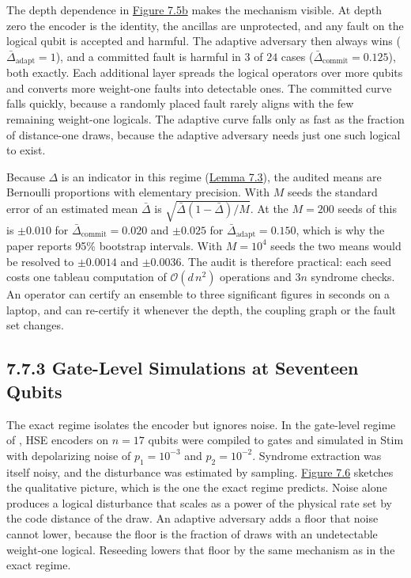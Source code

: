 \documentclass{report}
\theoremstyle{plain}
\theoremstyle{definition}
\theoremstyle{remark}
\newcommand{\bigO}[1]{\mathcal{O}\!\left(#1\right)}
\begin{document}
The depth dependence in \hyperref[fig:qec:disturbance]{Figure 7.5b} makes the mechanism visible. At depth zero the encoder is the identity, the ancillas are unprotected, and any fault on the logical qubit is accepted and harmful. The adaptive adversary then always wins ($\bar\Delta_{\mathrm{adapt}}=1$), and a committed fault is harmful in $3$ of $24$ cases ($\bar\Delta_{\mathrm{commit}}=0.125$), both exactly. Each additional layer spreads the logical operators over more qubits and converts more weight-one faults into detectable ones. The committed curve falls quickly, because a randomly placed fault rarely aligns with the few remaining weight-one logicals. The adaptive curve falls only as fast as the fraction of distance-one draws, because the adaptive adversary needs just one such logical to exist.

Because $\Delta$ is an indicator in this regime (\hyperref[lem:qec:indicator]{Lemma 7.3}), the audited means are Bernoulli proportions with elementary precision. With $M$ seeds the standard error of an estimated mean $\bar\Delta$ is $\sqrt{\bar\Delta(1-\bar\Delta)/M}$. At the $M=200$ seeds of \cite{guo2026qecaudit} this is $\pm0.010$ for $\bar\Delta_{\mathrm{commit}}=0.020$ and $\pm0.025$ for $\bar\Delta_{\mathrm{adapt}}=0.150$, which is why the paper reports 95\% bootstrap intervals. With $M=10^{4}$ seeds the two means would be resolved to $\pm0.0014$ and $\pm0.0036$. The audit is therefore practical: each seed costs one tableau computation of $\bigO{d\,n^{2}}$ operations and $3n$ syndrome checks. An operator can certify an ensemble to three significant figures in seconds on a laptop, and can re-certify it whenever the depth, the coupling graph or the fault set changes.

\subsection{7.7.3 Gate-Level Simulations at Seventeen Qubits}\label{sec:qec:results17}

The exact regime isolates the encoder but ignores noise. In the gate-level regime of \cite{guo2026qecaudit}, HSE encoders on $n=17$ qubits were compiled to gates and simulated in Stim with depolarizing noise of $p_1=10^{-3}$ and $p_2=10^{-2}$. Syndrome extraction was itself noisy, and the disturbance was estimated by sampling. \hyperref[fig:qec:stim]{Figure 7.6} sketches the qualitative picture, which is the one the exact regime predicts. Noise alone produces a logical disturbance that scales as a power of the physical rate set by the code distance of the draw. An adaptive adversary adds a floor that noise cannot lower, because the floor is the fraction of draws with an undetectable weight-one logical. Reseeding lowers that floor by the same mechanism as in the exact regime.
\end{document}
